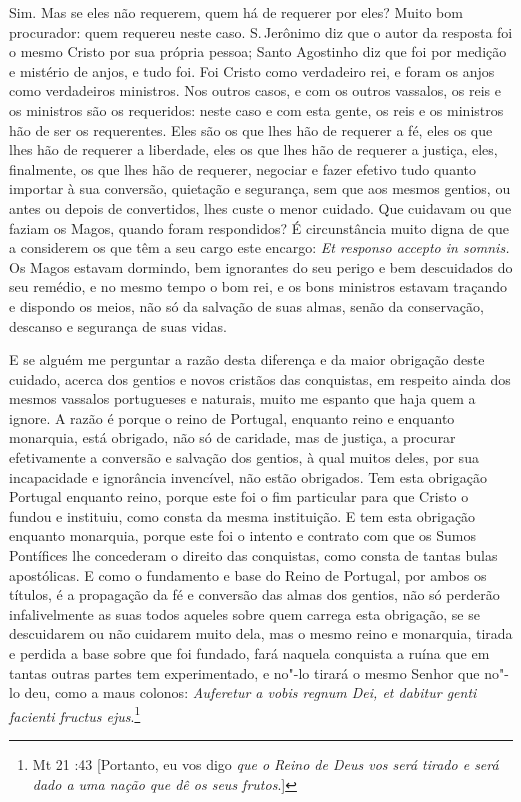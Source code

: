 Sim. Mas se eles não requerem, quem há de requerer por eles? Muito bom
procurador: quem requereu neste caso. S.\,Jerônimo diz que o autor da
resposta foi o mesmo Cristo por sua própria pessoa; Santo Agostinho diz
que foi por medição e mistério de anjos, e tudo foi. Foi Cristo como
verdadeiro rei, e foram os anjos como verdadeiros ministros. Nos outros
casos, e com os outros vassalos, os reis e os ministros são os
requeridos: neste caso e com esta gente, os reis e os ministros hão de
ser os requerentes. Eles são os que lhes hão de requerer a fé, eles os
que lhes hão de requerer a liberdade, eles os que lhes hão de requerer a
justiça, eles, finalmente, os que lhes hão de requerer, negociar e fazer
efetivo tudo quanto importar à sua conversão, quietação e segurança, sem
que aos mesmos gentios, ou antes ou depois de convertidos, lhes custe o
menor cuidado. Que cuidavam ou que faziam os Magos, quando foram
respondidos? É circunstância muito digna de que a considerem os que têm
a seu cargo este encargo: \emph{Et responso accepto in somnis.} Os Magos
estavam dormindo, bem ignorantes do seu perigo e bem descuidados do seu
remédio, e no mesmo tempo o bom rei, e os bons ministros estavam
traçando e dispondo os meios, não só da salvação de suas almas, senão da
conservação, descanso e segurança de suas vidas.

E se alguém me perguntar a razão desta diferença e da maior obrigação
deste cuidado, acerca dos gentios e novos cristãos das conquistas, em
respeito ainda dos mesmos vassalos portugueses e naturais, muito me
espanto que haja quem a ignore. A razão é porque o reino de Portugal,
enquanto reino e enquanto monarquia, está obrigado, não só de caridade,
mas de justiça, a procurar efetivamente a conversão e salvação dos
gentios, à qual muitos deles, por sua incapacidade e ignorância
invencível, não estão obrigados. Tem esta obrigação Portugal enquanto
reino, porque este foi o fim particular para que Cristo o fundou e
instituiu, como consta da mesma instituição. E tem esta obrigação
enquanto monarquia, porque este foi o intento e contrato com que os
Sumos Pontífices lhe concederam o direito das conquistas, como consta de
tantas bulas apostólicas. E como o fundamento e base do Reino de
Portugal, por ambos os títulos, é a propagação da fé e conversão das
almas dos gentios, não só perderão infalivelmente as suas todos aqueles
sobre quem carrega esta obrigação, se se descuidarem ou não cuidarem
muito dela, mas o mesmo reino e monarquia, tirada e perdida a base sobre
que foi fundado, fará naquela conquista a ruína que em tantas outras
partes tem experimentado, e no"-lo tirará o mesmo Senhor que no"-lo deu,
como a maus colonos: \emph{Auferetur a vobis regnum Dei, et dabitur
genti facienti fructus ejus}.\footnote{Mt 21 :43 [Portanto, eu vos digo \emph{que o Reino de Deus vos será tirado e será dado a uma nação que dê os seus frutos}.]}

